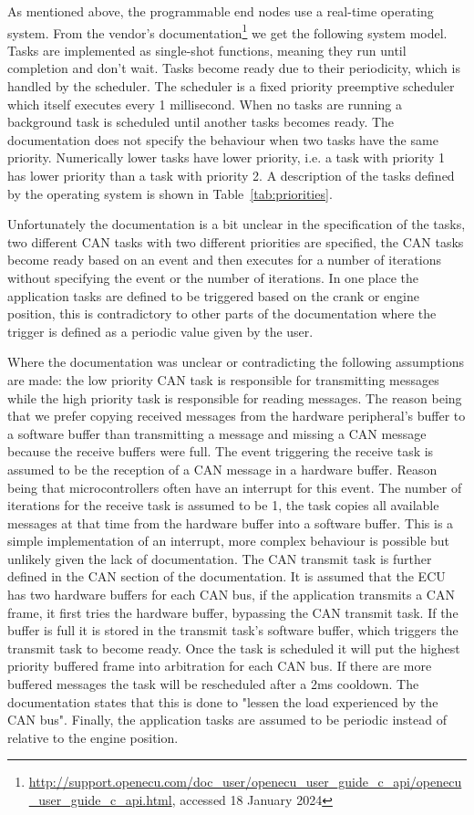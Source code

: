 \label{subsec:programmablenode}
As mentioned above, the programmable end nodes use a real-time operating system. From the vendor's documentation\footnote{\url{http://support.openecu.com/doc_user/openecu_user_guide_c_api/openecu_user_guide_c_api.html}, accessed 18 January 2024} we get the following system model. Tasks are implemented as single-shot functions, meaning they run until completion and don't wait. Tasks become ready due to their periodicity, which is handled by the scheduler. The scheduler is a fixed priority preemptive scheduler which itself executes every 1 millisecond. When no tasks are running a background task is scheduled until another tasks becomes ready. The documentation does not specify the behaviour when two tasks have the same priority. Numerically lower tasks have lower priority, i.e. a task with priority 1 has lower priority than a task with priority 2. A description of the tasks defined by the operating system is shown in Table~\ref{tab:priorities}. 



Unfortunately the documentation is a bit unclear in the specification of the tasks, two different CAN tasks with two different priorities are specified, the CAN tasks become ready based on an event and then executes for a number of iterations without specifying the event or the number of iterations. In one place the application tasks are defined to be triggered based on the crank or engine position, this is contradictory to other parts of the documentation where the trigger is defined as a periodic value given by the user. 

Where the documentation was unclear or contradicting the following assumptions are made: the low priority CAN task is responsible for transmitting messages while the high priority task is responsible for reading messages. The reason being that we prefer copying received messages from the hardware peripheral's buffer to a software buffer than transmitting a message and missing a CAN message because the receive buffers were full. The event triggering the receive task is assumed to be the reception of a CAN message in a hardware buffer. Reason being that microcontrollers often have an interrupt for this event. The number of iterations for the receive task is assumed to be 1, the task copies all available messages at that time from the hardware buffer into a software buffer. This is a simple implementation of an interrupt, more complex behaviour is possible but unlikely given the lack of documentation. The CAN transmit task is further defined in the CAN section of the documentation. It is assumed that the ECU has two hardware buffers for each CAN bus, if the application transmits a CAN frame, it first tries the hardware buffer, bypassing the CAN transmit task. If the buffer is full it is stored in the transmit task's software buffer, which triggers the transmit task to become ready. Once the task is scheduled it will put the highest priority buffered frame into arbitration for each CAN bus. If there are more buffered messages the task will be rescheduled after a 2ms cooldown. The documentation states that this is done to "lessen the load experienced by the CAN bus". Finally, the application tasks are assumed to be periodic instead of relative to the engine position.

